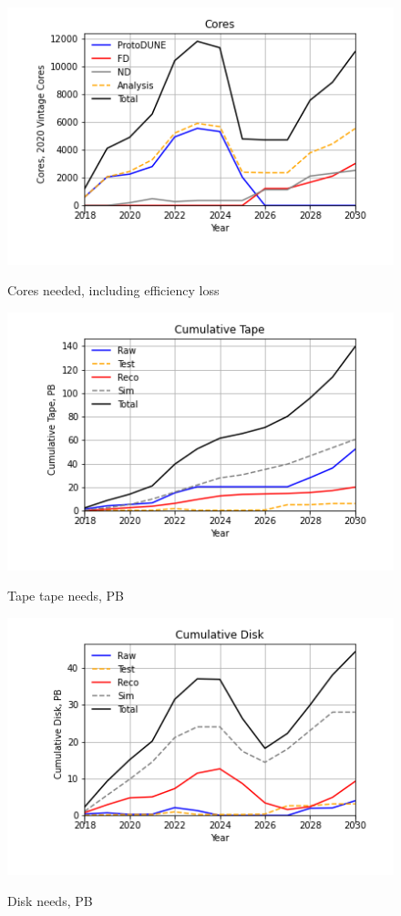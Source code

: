 \documentclass[12pt]{article}
\begin{document}
\begin{figure}
\centering\includegraphics[height=0.5\textwidth]{Cores.png}\label{Cores}
\caption{Cores needed, including efficiency loss}
\end{figure}
\begin{figure}
\centering\includegraphics[height=0.5\textwidth]{Cumulative-Tape.png}\label{CumulativeTape}
\caption{Tape tape needs, PB}
\end{figure}
\begin{figure}
\centering\includegraphics[height=0.5\textwidth]{Cumulative-Disk}\label{CumulativeDisk}
\caption{Disk needs, PB}
\end{figure}
\end{document}
